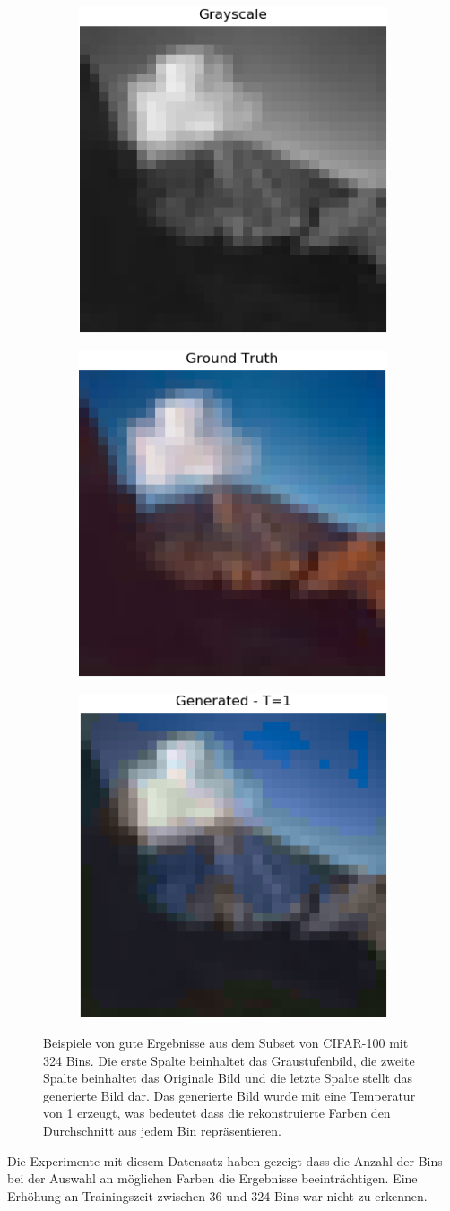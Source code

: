 \begin{figure}[H]
  \begin{subfigure}
    \centering
    \includegraphics[width=.24\textwidth]{resources/experiments/cifar/600_grayscale.png}
  \end{subfigure}
  \begin{subfigure}
    \centering
    \includegraphics[width=.24\textwidth]{resources/experiments/cifar/600_original.png}
  \end{subfigure}
  \begin{subfigure}
    \centering
    \includegraphics[width=.24\textwidth]{resources/experiments/cifar/600_t1.png}
  \end{subfigure}
  \caption{Beispiele von gute Ergebnisse aus dem Subset von CIFAR-100 mit 324 Bins. Die erste Spalte beinhaltet das Graustufenbild, die zweite Spalte
  beinhaltet das Originale Bild und die letzte Spalte stellt das generierte Bild dar. Das generierte Bild wurde mit eine Temperatur von 1
  erzeugt, was bedeutet dass die rekonstruierte Farben den Durchschnitt aus jedem Bin repräsentieren.}
  \label{image:gute-ergebnisse-cifar}
\end{figure}

Die Experimente mit diesem Datensatz haben gezeigt dass die Anzahl der Bins bei der Auswahl an möglichen Farben die Ergebnisse beeinträchtigen.
Eine Erhöhung an Trainingszeit zwischen 36 und 324 Bins war nicht zu erkennen.

